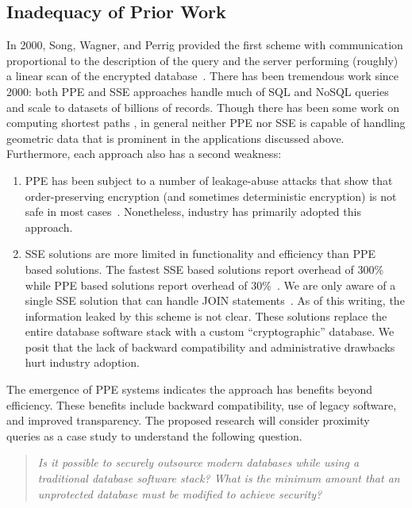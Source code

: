 \subsection{Inadequacy of Prior Work}

In 2000, Song, Wagner, and Perrig provided the first scheme with
communication proportional to the description of the query and the
server performing (roughly) a linear scan of the encrypted
database~\cite{SP:SonWagPer00}.  There has been tremendous work since
2000: both PPE and SSE approaches handle much of SQL and NoSQL queries
and scale to datasets of billions of records.
Though there has been some work on computing shortest paths
\cite{CCS:MNK15}, in general neither PPE nor SSE
is capable of handling geometric data that is prominent in the
applications discussed above. 
Furthermore, each approach also
has a second weakness:
\begin{enumerate}
\item PPE has been subject to a number of leakage-abuse attacks that show that order-preserving encryption (and sometimes deterministic encryption) is not safe in most cases~\cite{CCS:NavKamWri15,CCS:CGPR15,CCS:KKNO16,CCS:PouWri16,CCS:GMNRS16,EPRINT:GSBNR16,EPRINT:ZhaKatPap16}.  
Nonetheless, industry has primarily adopted this approach.
\item SSE solutions are more limited in functionality and efficiency than PPE based solutions.  The fastest SSE based solutions report overhead of 300\%~\cite{C:CJJKRS13,CCS:JJKRS13,NDSS:CJJJKR14,ESORICS:FJKNRS15} while PPE based solutions report overhead of 30\%~\cite{CACM:PRZB12}.  We are only aware of a single SSE solution that can handle JOIN statements~\cite{EPRINT:KamMoa16}.  As of this writing, the information  leaked by this scheme is not clear.  These solutions replace the entire database software stack with a custom ``cryptographic'' database.  We posit that the lack of backward compatibility and administrative drawbacks hurt industry adoption.  
\end{enumerate}

The emergence of PPE systems indicates the approach has benefits beyond efficiency.  These benefits include backward compatibility, use of legacy software, and improved transparency.
The proposed research will
consider proximity queries as a case study to understand the following
question.  \begin{quote}\emph{Is it possible to securely outsource
modern databases while using a traditional database software stack?
What is the minimum amount that an unprotected database must be modified
to achieve security?}\end{quote}


